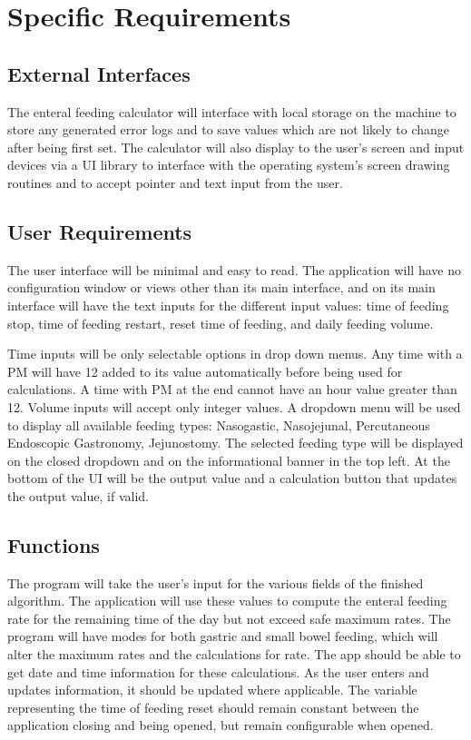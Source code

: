 \documentclass[fullpage,10pt, onecolumn, draftclsnofoot]{IEEEtran}
\begin{document}
\section{Specific Requirements}

\subsection{External Interfaces}
The enteral feeding calculator will interface with local storage on the machine to store any generated error logs and to save values which are not likely to change after being first set.
The calculator will also display to the user's screen and input devices via a UI library to interface with the operating system's screen drawing routines and to accept pointer and text input from the user.

\subsection{User Requirements}
The user interface will be minimal and easy to read. The application will have no configuration window
or views other than its main interface, and on its main interface will have the text inputs for the different
input values: time of feeding stop, time of feeding restart, reset time of feeding, and daily feeding volume.

Time inputs will be only selectable options in drop down menus. Any time with a PM will
have 12 added to its value automatically before being used for calculations. A time with PM at the end cannot have an hour value greater than 12.
Volume inputs will accept only integer values.
A dropdown menu will be used to display all available feeding types: Nasogastic, Nasojejunal, Percutaneous Endoscopic Gastronomy, Jejunostomy.
The selected feeding type will be displayed on the closed dropdown and on the informational banner in the top left. 
At the bottom of the UI will be the output value and a calculation
button that updates the output value, if valid.

\subsection{Functions}
The program will take the user's input for the various fields of the finished algorithm.
The application will use these values to compute the enteral feeding rate for the remaining time of the day but not exceed safe maximum rates.
The program will have modes for both gastric and small bowel feeding, which will alter the maximum rates and the calculations for rate.
The app should be able to get date and time information for these calculations.
As the user enters and updates information, it should be updated where applicable.
The variable representing the time of feeding reset should remain constant between the application closing and being opened, but remain configurable when opened.
\end{document}
